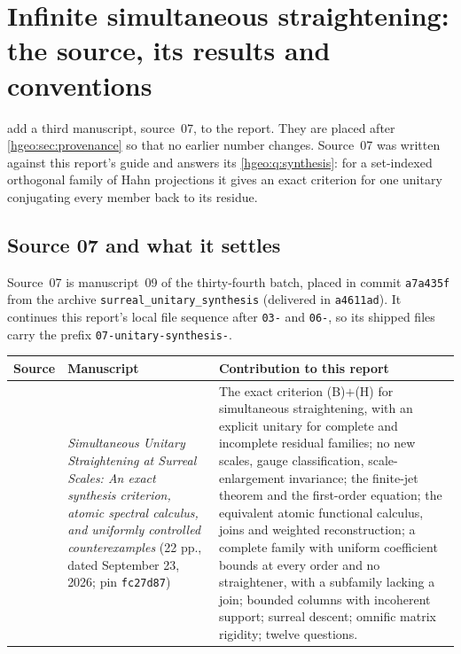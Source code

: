 \documentclass[11pt,letterpaper]{article}
\numberwithin{equation}{section}
\theoremstyle{definition}
\theoremstyle{remark}
\newcommand{\fn}[1]{\nolinkurl{#1}}
\begin{document}
\section{Infinite simultaneous straightening: the source, its results and
conventions}
\label{hgeo:us:sec:intro}

 add a third manuscript,
source~07, to the report. They are placed after \cref{hgeo:sec:provenance}
so that no earlier number changes. Source~07 was written against this
report's guide and answers its \cref{hgeo:q:synthesis}: for a set-indexed
orthogonal family of Hahn projections it gives an exact criterion for one
unitary conjugating every member back to its residue.

\subsection{Source 07 and what it settles}\label{hgeo:us:sub:source}
Source~07 is manuscript~09 of the thirty-fourth batch, placed in commit
\texttt{a7a435f} from the archive \fn{surreal_unitary_synthesis} (delivered
in \texttt{a4611ad}). It continues this report's local file sequence after
\fn{03-} and \fn{06-}, so its shipped files carry the prefix
\fn{07-unitary-synthesis-}.

\begin{center}
\small
\renewcommand{\arraystretch}{1.15}
\begin{tabular}{>{\raggedright\arraybackslash}p{}>{\raggedright\arraybackslash}p{}>{\raggedright\arraybackslash}p{}}
\toprule
Source & Manuscript & Contribution to this report\\
\midrule
07 & \emph{Simultaneous Unitary Straightening at Surreal Scales: An exact
synthesis criterion, atomic spectral calculus, and uniformly controlled
counterexamples} (22 pp., dated September 23, 2026; pin
\texttt{fc27d87}) &
The exact criterion (B)$+$(H) for simultaneous straightening, with an
explicit unitary for complete and incomplete residual families; no new
scales, gauge classification, scale-enlargement invariance; the finite-jet
theorem and the first-order equation; the equivalent atomic functional
calculus, joins and weighted reconstruction; a complete family with uniform
coefficient bounds at every order and no straightener, with a subfamily
lacking a join; bounded columns with incoherent support; surreal descent;
omnific matrix rigidity; twelve questions.\\
\bottomrule
\end{tabular}
\end{center}
\end{document}
